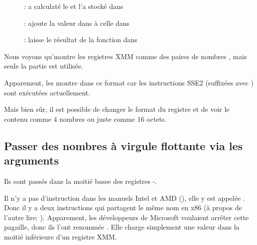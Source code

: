 \clearpage
\begin{figure}[H]
\centering
{}
\caption{\olly:  a calculaté le  et l'a stocké
dans }
\label{fig:FPU_SIMD_simple_olly3}
\end{figure}

\clearpage
\begin{figure}[H]
\centering
{}
\caption{\olly:  ajoute la valeur dans  à celle dans }
\label{fig:FPU_SIMD_simple_olly4}
\end{figure}

\clearpage
\begin{figure}[H]
\centering
{}
\caption{\olly: \FLD laisse le résultat de la fonction dans }
\label{fig:FPU_SIMD_simple_olly5}
\end{figure}

Nous voyons qu'\olly montre les registres XMM comme des paires de nombres \Tdouble,
mais seule la partie  est utilisée.

Apparement, \olly les montre dans ce format car les instructions SSE2 (suffixées
avec ) sont exécutées actuellement.

Mais bien sûr, il est possible de changer le format du registre et de voir le contenu
comme 4 nombres \Tfloat{} ou juste comme 16 octets.

\clearpage
\subsection{Passer des nombres à virgule flottante via les arguments}



Ils sont passés dans la moitié basse des registres -.



Il n'y a pas d'instruction  dans les manuels Intel et AMD (),
elle y est appelée .
Donc il y a deux instructions qui partagent le même nom en x86 (à propos de l'autre
lire: ).
Apparement, les développeurs de Microsoft voulaient arrêter cette pagaille, donc
ils l'ont renommée .
Elle charge simplement une valeur dans la moitié inférieure d'un registre XMM.

